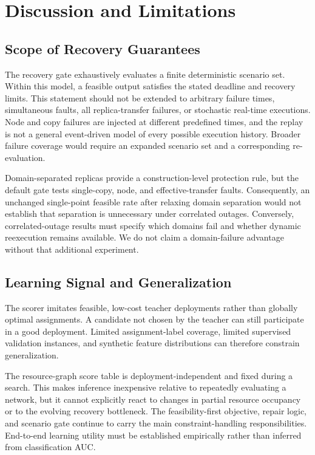 \section{Discussion and Limitations}
\label{sec:discussion}
\subsection{Scope of Recovery Guarantees}
The recovery gate exhaustively evaluates a finite deterministic scenario set.
Within this model, a feasible output satisfies the stated deadline and
recovery limits. This statement should not be extended to arbitrary failure
times, simultaneous faults, all replica-transfer failures, or stochastic
real-time executions. Node and copy failures are injected at different
predefined times, and the replay is not a general event-driven model of
every possible execution history. Broader failure coverage would require an
expanded scenario set and a corresponding re-evaluation.

Domain-separated replicas provide a construction-level protection rule, but
the default gate tests single-copy, node, and effective-transfer faults.
Consequently, an unchanged single-point feasible rate after relaxing domain
separation would not establish that separation is unnecessary under
correlated outages. Conversely, correlated-outage results must specify which
domains fail and whether dynamic reexecution remains available. We do not
claim a domain-failure advantage without that additional experiment.

\subsection{Learning Signal and Generalization}
The scorer imitates feasible, low-cost teacher deployments rather than
globally optimal assignments. A candidate not chosen by the teacher can
still participate in a good deployment. Limited assignment-label coverage,
limited supervised validation instances, and synthetic feature distributions
can therefore constrain generalization.

The resource-graph score table is deployment-independent and fixed during a
search. This makes inference inexpensive relative to repeatedly evaluating a
network, but it cannot explicitly react to changes in partial resource
occupancy or to the evolving recovery bottleneck. The feasibility-first
objective, repair logic, and scenario gate continue to carry the main
constraint-handling responsibilities. End-to-end learning utility must be
established empirically rather than inferred from classification AUC.

